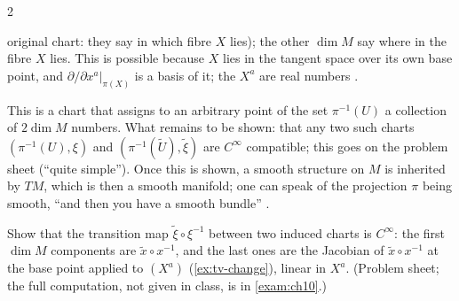 \begin{paracol}{2}
\begin{definition}
original chart: they say in which fibre $X$ lies); the other $\dim M$ say where in the fibre $X$ lies. This is possible because $X$ lies in the tangent space over its own base point, and $\partial/\partial x^a|_{\pi(X)}$ is a basis of it; the $X^a$ are real numbers
     .
\end{definition}
This is a chart that assigns to an arbitrary point of the set $\pi^{-1}(U)$ a collection of $2\dim M$ numbers. What remains to be shown: that any two such charts $(\pi^{-1}(U),\xi)$ and $(\pi^{-1}(\tilde U),\tilde\xi)$ are $C^\infty$ compatible; this goes on the problem sheet (``quite simple''). Once this is shown, a smooth structure on $M$ is inherited by $TM$, which
is then a smooth manifold; one can speak of the projection $\pi$ being smooth, ``and then you have a smooth bundle''    .
\begin{exercise}\label{ex:tb-compat}
Show that the transition map $\tilde\xi\circ\xi^{-1}$ between two induced charts is $C^\infty$: the first $\dim M$ components are $\tilde x\circ x^{-1}$, and the last ones are the Jacobian of $\tilde x\circ x^{-1}$ at the base point applied to $(X^a)$ (\cref{ex:tv-change}), linear in $X^a$. (Problem sheet; the full computation, not given in class, is in
\cref{exam:ch10}.)
\end{exercise}


\end{paracol}
